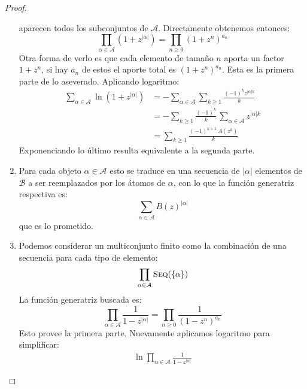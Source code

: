 \begin{proof}
\begin{enumerate}
      aparecen todos los subconjuntos de \(\mathcal{A}\).
      Directamente obtenemos entonces:
      \begin{equation*}
	\prod_{\alpha \in \mathcal{A}}
	    \left( 1 + z^{\lvert \alpha \rvert} \right)
	  = \prod_{n \ge 0} (1 + z^n)^{a_n}
      \end{equation*}
      Otra forma de verlo es que cada elemento de tamaño \(n\)
      aporta un factor \(1 + z^n\),
      si hay \(a_n\) de estos
      el aporte total es \((1 + z^n)^{a_n}\).
      Esta es la primera parte de lo aseverado.
      Aplicando logaritmo:
      \begin{align*}
	\sum_{\alpha \in \mathcal{A}}
	    \ln \left(1 + z^{\lvert \alpha \rvert} \right)
	  &= -\sum_{\alpha \in \mathcal{A}}
		\sum_{k \ge 1}
		  \frac{(-1)^k z^{\lvert \alpha \rvert k}}{k}  \\
	  &= -\sum_{k \ge 1} \frac{(-1)^k}{k} \,
		\sum_{\alpha \in \mathcal{A}}
		  z^{\lvert \alpha \rvert k} \\
	  &= \sum_{k \ge 1} \frac{(-1)^{k + 1} \, A(z^k)}{k}
      \end{align*}
      Exponenciando lo último
      resulta equivalente a la segunda parte.
    \item %
      Para cada objeto \(\alpha \in \mathcal{A}\)
      esto se traduce
      en una secuencia de \(\lvert \alpha \rvert\) elementos de \(\mathcal{B}\)
      a ser reemplazados por los átomos de \(\alpha\),
      con lo que la función generatriz respectiva es:
      \begin{equation*}
	\sum_{\alpha \in \mathcal{A}} B(z)^{\lvert \alpha \rvert}
      \end{equation*}
      que es lo prometido.
    \item %
      Podemos considerar un multiconjunto finito
      como la combinación de una secuencia
      para cada tipo de elemento:
      \begin{equation*}
	\prod_{\alpha \in \mathcal{A}} \operatorname{\textsc{Seq}}(\{ \alpha \})
      \end{equation*}
      La función generatriz buscada es:
      \begin{equation*}
	\prod_{\alpha \in \mathcal{A}}
	  \frac{1}{1 - z^{\lvert \alpha \rvert}}
	  = \prod_{n \ge 0} \frac{1}{(1 - z^n)^{a_n}}
      \end{equation*}
      Esto provee la primera parte.
      Nuevamente aplicamos logaritmo para simplificar:
      \begin{align*}
	\ln \prod_{\alpha \in \mathcal{A}}
	       \frac{1}{1 - z^{\lvert \alpha \rvert}}

\end{align*}
\end{enumerate}
\end{proof}
